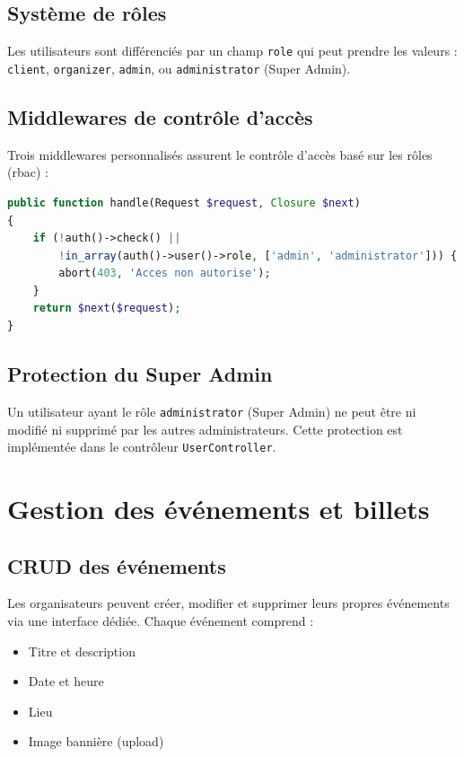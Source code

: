 \documentclass[a4paper,12pt,twoside]{report}
\begin{document}
\subsection{Système de rôles}

Les utilisateurs sont différenciés par un champ \texttt{role} qui peut prendre les valeurs : \texttt{client}, \texttt{organizer}, \texttt{admin}, ou \texttt{administrator} (Super Admin).

\subsection{Middlewares de contrôle d'accès}

Trois middlewares personnalisés assurent le contrôle d'accès basé sur les rôles (\gls{rbac}) :

\begin{lstlisting}[language=PHP,caption=Middleware AdminMiddleware]
public function handle(Request $request, Closure $next)
{
    if (!auth()->check() || 
        !in_array(auth()->user()->role, ['admin', 'administrator'])) {
        abort(403, 'Acces non autorise');
    }
    return $next($request);
}
\end{lstlisting}

\subsection{Protection du Super Admin}

Un utilisateur ayant le rôle \texttt{administrator} (Super Admin) ne peut être ni modifié ni supprimé par les autres administrateurs. Cette protection est implémentée dans le contrôleur \texttt{UserController}.

\section{Gestion des événements et billets}

\subsection{CRUD des événements}

Les organisateurs peuvent créer, modifier et supprimer leurs propres événements via une interface dédiée. Chaque événement comprend :
\begin{itemize}
    \item Titre et description
    \item Date et heure
    \item Lieu
    \item Image bannière (upload)
\end{itemize}
\end{document}
